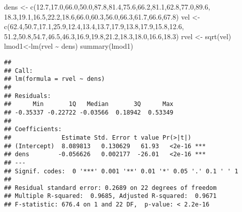 \documentclass[
]{article}
\newenvironment{Shaded}{\begin{snugshade}}{\end{snugshade}}
\newcommand{\FloatTok}[1]{\textcolor[rgb]{0.00,0.00,0.81}{#1}}
\newcommand{\FunctionTok}[1]{\textcolor[rgb]{0.00,0.00,0.00}{#1}}
\newcommand{\NormalTok}[1]{#1}
\newcommand{\OtherTok}[1]{\textcolor[rgb]{0.56,0.35,0.01}{#1}}
\newcommand{\SpecialCharTok}[1]{\textcolor[rgb]{0.00,0.00,0.00}{#1}}
\begin{document}
\begin{Shaded}
\begin{Highlighting}[]
\NormalTok{dens }\OtherTok{\textless{}{-}} \FunctionTok{c}\NormalTok{(}\FloatTok{12.7}\NormalTok{,}\FloatTok{17.0}\NormalTok{,}\FloatTok{66.0}\NormalTok{,}\FloatTok{50.0}\NormalTok{,}\FloatTok{87.8}\NormalTok{,}\FloatTok{81.4}\NormalTok{,}\FloatTok{75.6}\NormalTok{,}\FloatTok{66.2}\NormalTok{,}\FloatTok{81.1}\NormalTok{,}\FloatTok{62.8}\NormalTok{,}\FloatTok{77.0}\NormalTok{,}\FloatTok{89.6}\NormalTok{,}
           \FloatTok{18.3}\NormalTok{,}\FloatTok{19.1}\NormalTok{,}\FloatTok{16.5}\NormalTok{,}\FloatTok{22.2}\NormalTok{,}\FloatTok{18.6}\NormalTok{,}\FloatTok{66.0}\NormalTok{,}\FloatTok{60.3}\NormalTok{,}\FloatTok{56.0}\NormalTok{,}\FloatTok{66.3}\NormalTok{,}\FloatTok{61.7}\NormalTok{,}\FloatTok{66.6}\NormalTok{,}\FloatTok{67.8}\NormalTok{)}
\NormalTok{vel }\OtherTok{\textless{}{-}} \FunctionTok{c}\NormalTok{(}\FloatTok{62.4}\NormalTok{,}\FloatTok{50.7}\NormalTok{,}\FloatTok{17.1}\NormalTok{,}\FloatTok{25.9}\NormalTok{,}\FloatTok{12.4}\NormalTok{,}\FloatTok{13.4}\NormalTok{,}\FloatTok{13.7}\NormalTok{,}\FloatTok{17.9}\NormalTok{,}\FloatTok{13.8}\NormalTok{,}\FloatTok{17.9}\NormalTok{,}\FloatTok{15.8}\NormalTok{,}\FloatTok{12.6}\NormalTok{,}
          \FloatTok{51.2}\NormalTok{,}\FloatTok{50.8}\NormalTok{,}\FloatTok{54.7}\NormalTok{,}\FloatTok{46.5}\NormalTok{,}\FloatTok{46.3}\NormalTok{,}\FloatTok{16.9}\NormalTok{,}\FloatTok{19.8}\NormalTok{,}\FloatTok{21.2}\NormalTok{,}\FloatTok{18.3}\NormalTok{,}\FloatTok{18.0}\NormalTok{,}\FloatTok{16.6}\NormalTok{,}\FloatTok{18.3}\NormalTok{)}
\NormalTok{rvel }\OtherTok{\textless{}{-}} \FunctionTok{sqrt}\NormalTok{(vel)}
\NormalTok{lmod1}\OtherTok{\textless{}{-}}\FunctionTok{lm}\NormalTok{(rvel }\SpecialCharTok{\textasciitilde{}}\NormalTok{ dens)}
\FunctionTok{summary}\NormalTok{(lmod1)}
\end{Highlighting}
\end{Shaded}

\begin{verbatim}
## 
## Call:
## lm(formula = rvel ~ dens)
## 
## Residuals:
##      Min       1Q   Median       3Q      Max 
## -0.35337 -0.22722 -0.03566  0.18942  0.53349 
## 
## Coefficients:
##              Estimate Std. Error t value Pr(>|t|)    
## (Intercept)  8.089813   0.130629   61.93   <2e-16 ***
## dens        -0.056626   0.002177  -26.01   <2e-16 ***
## ---
## Signif. codes:  0 '***' 0.001 '**' 0.01 '*' 0.05 '.' 0.1 ' ' 1
## 
## Residual standard error: 0.2689 on 22 degrees of freedom
## Multiple R-squared:  0.9685, Adjusted R-squared:  0.9671 
## F-statistic: 676.4 on 1 and 22 DF,  p-value: < 2.2e-16
\end{verbatim}
\end{document}
